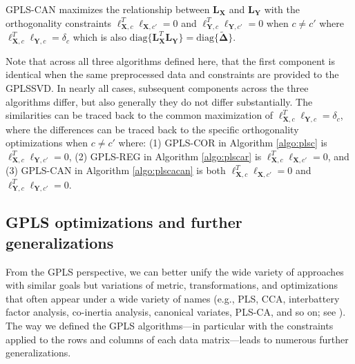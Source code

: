 \documentclass[12pt]{article}
\begin{document}
GPLS-CAN maximizes the relationship between \({\mathbf L}_{\mathbf X}\)
and \({\mathbf L}_{\mathbf Y}\) with the orthogonality constraints
\({\boldsymbol \ell}_{{\mathbf X},c}^{T}{\boldsymbol \ell}_{{\mathbf X},c'} = 0\)
and
\({\boldsymbol \ell}_{{\mathbf Y},c}^{T}{\boldsymbol \ell}_{{\mathbf Y},c'} = 0\)
when \(c \neq c'\) where
\({\boldsymbol \ell}_{{\mathbf X},c}^{T}{\boldsymbol \ell}_{{\mathbf Y},c} = \delta_{c}\)
which is also
\(\mathrm{diag\{}{\mathbf L}_{\mathbf X}^{T}{\mathbf L}_{\mathbf Y}\mathrm{\}} = \mathrm{diag\{}\widetilde{\boldsymbol \Delta}\mathrm{\}}\).

Note that across all three algorithms defined here, that the first
component is identical when the same preprocessed data and constraints
are provided to the GPLSSVD. In nearly all cases, subsequent components
across the three algorithms differ, but also generally they do not
differ substantially. The similarities can be traced back to the common
maximization of
\({\boldsymbol \ell}_{{\mathbf X},c}^{T}{\boldsymbol \ell}_{{\mathbf Y},c} = \delta_{c}\),
where the differences can be traced back to the specific orthogonality
optimizations when \(c \neq c'\) where: (1) GPLS-COR in Algorithm
\ref{algo:plsc} is
\({\boldsymbol \ell}_{{\mathbf X},c}^{T}{\boldsymbol \ell}_{{\mathbf Y},c'} = 0\),
(2) GPLS-REG in Algorithm \ref{algo:plscar} is
\({\boldsymbol \ell}_{{\mathbf X},c}^{T}{\boldsymbol \ell}_{{\mathbf X},c'} = 0\),
and (3) GPLS-CAN in Algorithm \ref{algo:plscacan} is both
\({\boldsymbol \ell}_{{\mathbf X},c}^{T}{\boldsymbol \ell}_{{\mathbf X},c'} = 0\)
and
\({\boldsymbol \ell}_{{\mathbf Y},c}^{T}{\boldsymbol \ell}_{{\mathbf Y},c'} = 0\).

\hypertarget{gpls-optimizations-and-further-generalizations}{%
\subsection{GPLS optimizations and further
generalizations}\label{gpls-optimizations-and-further-generalizations}}

From the GPLS perspective, we can better unify the wide variety of
approaches with similar goals but variations of metric, transformations,
and optimizations that often appear under a wide variety of names (e.g.,
PLS, CCA, interbattery factor analysis, co-inertia analysis, canonical
variates, PLS-CA, and so on; see \citet{abdi2017canonical}). The way we
defined the GPLS algorithms---in particular with the constraints applied
to the rows and columns of each data matrix---leads to numerous further
generalizations.
\end{document}
